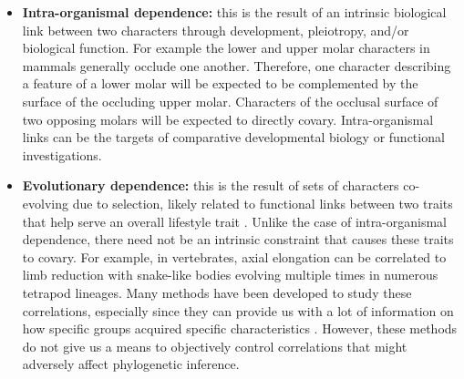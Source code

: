 \documentclass[12pt,letterpaper]{article}
\begin{document}
\begin{itemize}
    \item \textbf{Intra-organismal dependence:} this is the result of an intrinsic biological link between two characters through development, pleiotropy, and/or biological function.
    For example the lower and upper molar characters in mammals generally occlude one another. 
    Therefore, one character describing a feature of a lower molar will be expected to be complemented by the surface of the occluding upper molar.
    Characters of the occlusal surface of two opposing molars will be expected to directly covary.
    Intra-organismal links can be the targets of comparative developmental biology \citep{goswami2010,kelly2010reduced,stoessel2013morphological,goswami2014macroevolutionary} or functional investigations. %

    \item \textbf{Evolutionary dependence:} this is the result of sets of characters co-evolving due to selection, likely related to functional links between two traits that help serve an overall lifestyle trait \citep{ClarkeMiddleton2008}. 
    Unlike the case of intra-organismal dependence, there need not be an intrinsic constraint that causes these traits to covary.
    For example, in vertebrates, axial elongation can be correlated to limb reduction with snake-like bodies evolving multiple times in numerous tetrapod lineages.
    Many methods have been developed to study these correlations, especially since they can provide us with a lot of information on how specific groups acquired specific characteristics \citep{Lande1983,Maddison1990,Pagel1994,Pagel2006,Grabowski2016}.
    However, these methods do not give us a means to objectively control correlations that might adversely affect phylogenetic inference. %


\end{itemize}
\end{document}
